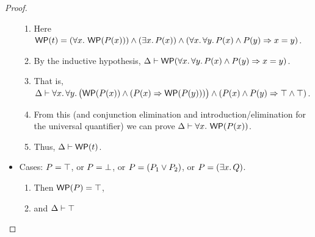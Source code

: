 \documentclass[10pt,letter]{article}
\begin{document}
\begin{proof}
\begin{itemize}
    \begin{enumerate}
      \item 
        Here
        $\mathop{\mathsf{WP}}(t) = 
        (\forall x.\, \mathop{\mathsf{WP}}(P(x))) \wedge (\exists x.\, P(x)) \wedge (\forall x.\, \forall y.\, P(x) \wedge P(y) \Rightarrow x=y)$.
      \item 
        By the inductive hypothesis, 
        $\Delta \vdash \mathop{\mathsf{WP}}(\forall x.\, \forall y.\, P(x) \wedge P(y) \Rightarrow x=y)$.
      \item
      	That is, 
	$\Delta \vdash \forall x.\, \forall y.\, \bigl(\mathop{\mathsf{WP}}(P(x)) \wedge (P(x) \Rightarrow \mathop{\mathsf{WP}}(P(y)))\bigr) \wedge (P(x) \wedge P(y) \Rightarrow \top \wedge \top)$.
	  \item
	    From this (and conjunction elimination and introduction/elimination
	    for the universal quantifier) we can prove 
	      $\Delta \vdash \forall x.\, \mathop{\mathsf{WP}}(P(x))$.
      \item 
        Thus, $\Delta \vdash \mathop{\mathsf{WP}}(t)$.
      \end{enumerate}
      
  \item Cases: $P = \top$, or $P = \bot$, or $P = (P_1 \vee P_2)$, or $P = (\exists x.\, Q)$.
      \begin{enumerate}
      \item 
      	Then $\mathop{\mathsf{WP}}(P) = \top$,
      \item
        and $\Delta \vdash \top$ 
      \end{enumerate}
            

\end{itemize}
\end{proof}
\end{document}
